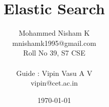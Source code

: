\documentclass[a4paper,10pt]{article}
\title{\Huge {\textbf {Elastic Search}}}
\author{
  \Large { Mohammed Nisham K } \\
  mnishamk1995@gmail.com \\
  \small Roll No 39, S7 CSE \\
  \\
  \Large {Guide : Vipin Vasu A V}\\
  vipin@cet.ac.in
}
\date{\today}
\begin{document}
\maketitle
\nocite{*}

\renewcommand{\abstractname}{\Large Abstract}

{}

\end{document}
